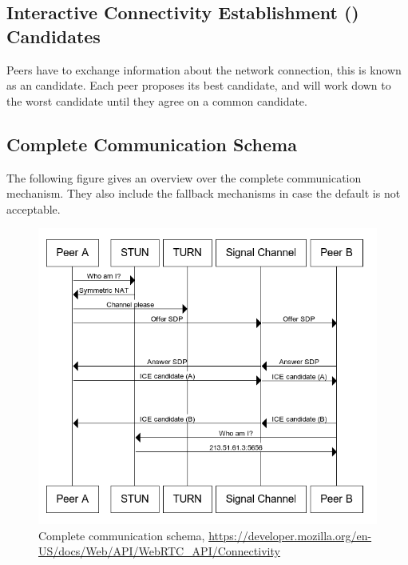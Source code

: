 \subsection{Interactive Connectivity Establishment () Candidates}
Peers have to exchange information about the network connection, this is known as an  candidate. Each peer proposes its best candidate, and will work down to the worst candidate until they agree on a common candidate.

\subsection{Complete Communication Schema}
The following figure gives an overview over the complete communication mechanism. They also include the fallback mechanisms in case the default is not acceptable.

\begin{figure}[H]
	\includegraphics[scale=0.5]{images/webrtc-complete-diagram.png}
	\centering
	\caption{ Complete communication schema, \url{https://developer.mozilla.org/en-US/docs/Web/API/WebRTC_API/Connectivity}}
	\label{fig:WebRTC}
\end{figure}
